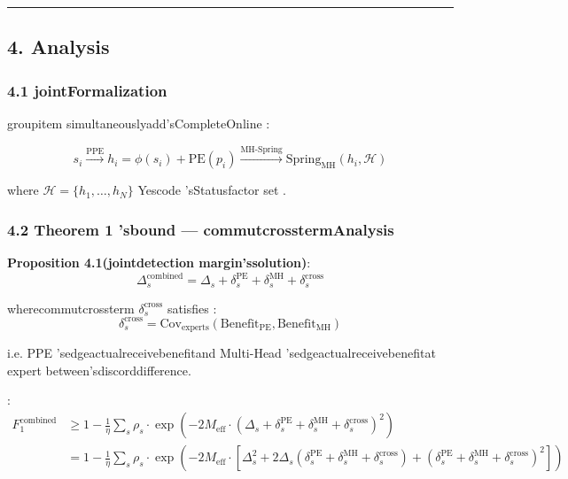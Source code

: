 \documentclass[
  12pt,
]{article}
\begin{document}
\begin{center}\rule{0.5\linewidth}{0.5pt}\end{center}

\subsection{4. Analysis}\label{ux7ec4ux5408ux5206ux6790}

\subsubsection{4.1 jointFormalization }\label{ux8054ux5408ux5f62ux5f0fux5316}

groupitem simultaneouslyadd'sCompleteOnline : 

\[\boxed{s_i \xrightarrow{\text{PPE}} h_i = \phi(s_i) + \text{PE}(p_i) \xrightarrow{\text{MH-Spring}} \text{Spring}_{\text{MH}}(h_i, \mathcal{H})}\]

where \(\mathcal{H} = \{h_1, \ldots, h_N\}\) Yescode 'sStatusfactor set . 

\subsubsection{4.2 Theorem 1 'sbound  ---
commutcrosstermAnalysis}\label{theorem-1-ux7684ux8054ux5408ux754c-ux4ea4ux53c9ux9879ux5206ux6790}

\textbf{Proposition 4.1(jointdetection margin'ssolution)}: 
\[\boxed{\Delta_s^{\text{combined}} = \Delta_s + \delta_s^{\text{PE}} + \delta_s^{\text{MH}} + \delta_s^{\text{cross}}}\]

wherecommutcrossterm \(\delta_s^{\text{cross}}\) satisfies : 
\[\delta_s^{\text{cross}} = \text{Cov}_{\text{experts}}\left(\text{Benefit}_{\text{PE}}, \text{Benefit}_{\text{MH}}\right)\]

i.e. PPE 'sedgeactualreceivebenefitand  Multi-Head 'sedgeactualreceivebenefitat expert between'sdiscorddifference. 

\textbf{}:  \begin{align*}
F_1^{\text{combined}} &\geq 1 - \frac{1}{\eta} \sum_s \rho_s \cdot \exp\left(-2M_{\text{eff}} \cdot (\Delta_s + \delta_s^{\text{PE}} + \delta_s^{\text{MH}} + \delta_s^{\text{cross}})^2\right) \\
&= 1 - \frac{1}{\eta} \sum_s \rho_s \cdot \exp\left(-2M_{\text{eff}} \cdot \left[\Delta_s^2 + 2\Delta_s(\delta_s^{\text{PE}} + \delta_s^{\text{MH}} + \delta_s^{\text{cross}}) + (\delta_s^{\text{PE}} + \delta_s^{\text{MH}} + \delta_s^{\text{cross}})^2\right]\right)
\end{align*}
\end{document}
